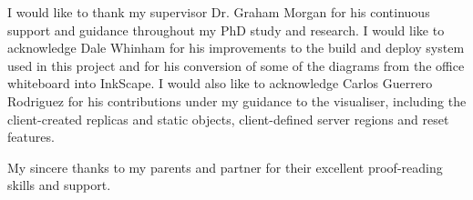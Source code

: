 
\begin{acknowledgements}      

I would like to thank my supervisor Dr. Graham Morgan for his continuous support and guidance throughout my PhD study and research.
I would like to acknowledge Dale Whinham for his improvements to the build and deploy system used in this project and for his conversion of some of the diagrams from the office whiteboard into InkScape. I would also like to acknowledge Carlos Guerrero Rodriguez for his contributions under my guidance to the visualiser, including the client-created replicas and static objects, client-defined server regions and reset features.

My sincere thanks to my parents and partner for their excellent proof-reading skills and support. 
 


\end{acknowledgements}
